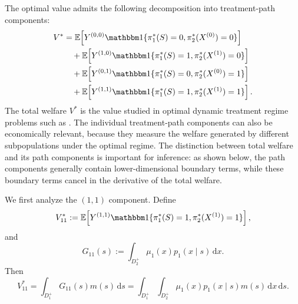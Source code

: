 \documentclass[12pt]{article}
\newcommand{\1}{\mathbf{1}}
\begin{document}
The optimal value admits the following decomposition into treatment-path
components:
\begin{align*}
V^*
&=
\mathbb E\!\left[
Y^{(0,0)}
\mathbbm 1\{\pi_1^*(S)=0,\pi_2^*(X^{(0)})=0\}
\right] \\
&\quad+
\mathbb E\!\left[
Y^{(1,0)}
\mathbbm 1\{\pi_1^*(S)=1,\pi_2^*(X^{(1)})=0\}
\right] \\
&\quad+
\mathbb E\!\left[
Y^{(0,1)}
\mathbbm 1\{\pi_1^*(S)=0,\pi_2^*(X^{(0)})=1\}
\right] \\
&\quad+
\mathbb E\!\left[
Y^{(1,1)}
\mathbbm 1\{\pi_1^*(S)=1,\pi_2^*(X^{(1)})=1\}
\right].
\end{align*}
The total welfare $V^*$ is the value studied in optimal dynamic treatment
regime problems such as \cite{chen2023optimaldynamic}. The individual
treatment-path components can also be economically relevant, because they
measure the welfare generated by different subpopulations under the optimal
regime. The distinction between total welfare and its path components is
important for inference: as shown below, the path components generally contain
lower-dimensional boundary terms, while these boundary terms cancel in the
derivative of the total welfare.

We first analyze the $(1,1)$ component. Define
\[
V_{11}^*
:=
\mathbb E\!\left[
Y^{(1,1)}
\mathbbm 1\{\pi_1^*(S)=1,\pi_2^*(X^{(1)})=1\}
\right],
\]
and
\[
G_{11}(s)
:=
\int_{D_2^+}\mu_1(x)p_1(x\mid s)\,\mathrm dx.
\]
Then
\[
V_{11}^*
=
\int_{D_1^+}G_{11}(s)m(s)\,\mathrm ds
=
\int_{D_1^+}\int_{D_2^+}
\mu_1(x)p_1(x\mid s)m(s)\,\mathrm dx\,\mathrm ds.
\]
\end{document}
